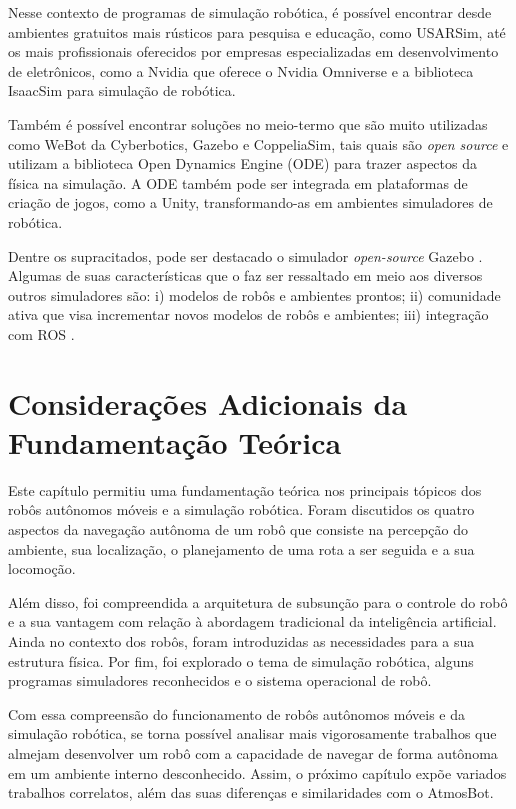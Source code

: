 Nesse contexto de programas de simulação robótica,  é possível encontrar desde ambientes gratuitos mais rústicos para pesquisa e educação, como USARSim,  até os mais profissionais oferecidos por empresas especializadas em desenvolvimento de eletrônicos, como a Nvidia que oferece o Nvidia Omniverse e a biblioteca IsaacSim para simulação de robótica. 

Também é possível encontrar soluções no meio-termo que são muito utilizadas como WeBot da Cyberbotics, Gazebo e CoppeliaSim, tais quais são \textit{open source} e utilizam a biblioteca Open Dynamics Engine (ODE) para trazer aspectos da física na simulação.  A ODE também pode ser integrada em plataformas de criação de jogos, como a Unity, transformando-as em ambientes simuladores de robótica. 

Dentre os supracitados, pode ser destacado o simulador \textit{open-source} Gazebo \cite{gazeboDesigns:2004}. Algumas de suas características que o faz ser ressaltado em meio aos diversos outros simuladores são: i) modelos de robôs e ambientes prontos; ii) comunidade ativa que visa incrementar novos modelos de robôs e ambientes; iii) integração com ROS \cite{gazeboDesigns:2004, pickSimulatorFarley:2022}.

\section{Considerações Adicionais da Fundamentação Teórica}

Este capítulo permitiu uma fundamentação teórica nos principais tópicos dos robôs autônomos móveis e a simulação robótica. Foram discutidos os quatro aspectos da navegação autônoma de um robô que consiste na percepção do ambiente, sua localização, o planejamento de uma rota a ser seguida e a sua locomoção. 

Além disso, foi compreendida a arquitetura de subsunção para o controle do robô e a sua vantagem com relação à abordagem tradicional da inteligência artificial. Ainda no contexto dos robôs, foram introduzidas as necessidades para a sua estrutura física.  Por fim, foi explorado o tema de simulação robótica, alguns programas simuladores reconhecidos e o sistema operacional de robô. 

Com essa compreensão do funcionamento de robôs autônomos móveis e da simulação robótica, se torna possível analisar mais vigorosamente trabalhos que almejam desenvolver um robô com a capacidade de navegar de forma autônoma em um ambiente interno desconhecido. Assim, o próximo capítulo expõe variados trabalhos correlatos, além das suas diferenças e similaridades com o AtmosBot.


